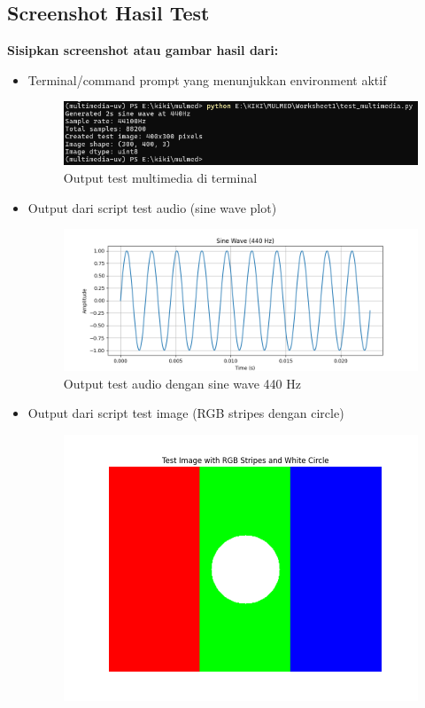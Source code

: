 \documentclass[11pt,a4paper]{article}
\begin{document}
\subsection{Screenshot Hasil Test}
\textbf{Sisipkan screenshot atau gambar hasil dari:}
\begin{itemize}
    \item Terminal/command prompt yang menunjukkan environment aktif
        \begin{figure}[H]
        \centering
        \includegraphics[scale=0.84]{Figure/OutputMultimedia.png}
        \caption{Output test multimedia di terminal} 
        \vspace{0.1cm}
        \end{figure}
    \item Output dari script test audio (sine wave plot)
        \begin{figure}[H]
        \centering
        \includegraphics[scale=0.5]{Figure/sine_wave_test.png}
        \caption{Output test audio dengan sine wave 440 Hz} 
        \vspace{0.1cm}
        \end{figure}
    \item Output dari script test image (RGB stripes dengan circle)
        \begin{figure}[H]
        \centering
        \includegraphics[scale=0.5]{Figure/test_image.png}

\end{figure}
\end{itemize}
\end{document}
